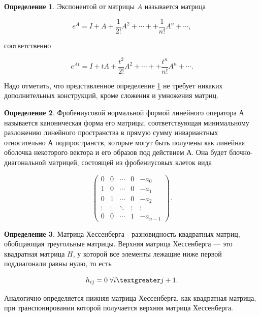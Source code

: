 \documentclass[master, och, diploma, times]{sty/SCWorks}
\theoremstyle{plain}
\theoremstyle{definition}
\newtheorem{defn}{Определение}[section]
\numberwithin{equation}{section}
\begin{document}
\begin{defn}\label{def:exp}
Экспонентой от матрицы $A$ называется матрица

\begin{equation}
e^A=I+A+\frac{1}{2!}A^2+\cdots++\frac{1}{n!}A^n + \cdots,
\end{equation}

\noindent соответственно

\begin{equation}
e^{At}=I+tA+\frac{t^2}{2!}A^2+\cdots++\frac{t^n}{n!}A^n + \cdots.
\end{equation}
\end{defn}

Надо отметить, что представленное определение \ref{def:exp} не требует никаких дополнительных конструкций, кроме сложения и умножения матриц. 

\begin{defn}
Фробениусовой нормальной формой линейного оператора $А$ называется каноническая форма его матрицы, соответствующая минимальному разложению линейного пространства в прямую сумму инвариантных относительно $А$ подпространств, которые могут быть получены как линейная оболочка некоторого вектора и его образов под действием А. Она будет блочно-диагональной матрицей, состоящей из фробениусовых клеток вида

\begin{equation}
\begin{pmatrix}
0&0&\cdots&0&-a_0\\
1&0&\cdots&0&-a_1\\
0&1&\cdots&0&-a_2\\
\vdots&\vdots&\ddots&\vdots&\vdots\\
0&0&\cdots&1&-a_{n-1}
\end{pmatrix}.
\end{equation}

\end{defn}

\begin{defn}
Матрица Хессенберга - разновидность квадратных матриц, обобщающая треугольные матрицы. Верхняя матрица Хессенберга — это квадратная матрица ${\displaystyle H}$, у которой все элементы лежащие ниже первой поддиагонали равны нулю, то есть 

\begin{equation}
h_{ij}=0 \; \forall i \textgreater j+1.	
\end{equation}

\noindent Аналогично определяется нижняя матрица Хессенберга, как квадратная матрица, при транспонировании которой получается верхняя матрица Хессенберга.
\end{defn}
\end{document}
